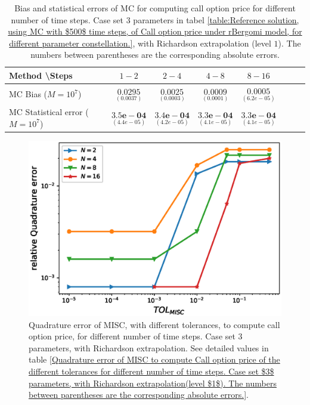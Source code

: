 \begin{table}[h!]
	\centering
	\begin{tabular}{l*{6}{c}r}
		Method \textbackslash  Steps            & $1-2$ & $2-4$ & $4-8$ & $8-16$  \\
		\hline
		MC Bias ($M=10^7$)  &$\underset{(  0.0037
			)}{\mathbf{0.0295}}$  & $\underset{( 0.0003)}{\mathbf{0.0025}}$  & $\underset{(   0.0001)}{\mathbf{0.0009}}$  & $\underset{(  6.2e-05)}{\mathbf{0.0005}}$ \\	
		
		MC Statistical error ($M=10^7$)   & $\underset{(  4.4e-05)}{\mathbf{3.5e-04}}$  & $\underset{(   4.2e-05)}{\mathbf{3.4e-04}}$  & $\underset{(  4.1e-05)}{\mathbf{3.3e-04}}$ & $\underset{(  4.1e-05)}{\mathbf{3.3e-04}}$ \\	
	
		\hline
	\end{tabular}
	\caption{Bias and statistical errors of MC   for computing call option price  for different number of time steps. Case set $3$ parameters in tabel \ref{table:Reference solution, using MC with $500$ time steps, of Call option price under rBergomi model, for different parameter constellation.}, with Richardson extrapolation (level $1$). The numbers between parentheses are the corresponding absolute errors.}
	\label{Bias and Statistical errors of MC ($M=10^7$)  for computing Call option price  for different number of time steps. Case set $3$ parameters, with Richardson extrapolation (level1). The numbers between parentheses are the corresponding absolute errors.}
\end{table}








\begin{figure}[h!]
	\centering
	\includegraphics[width=0.5\linewidth]{./figures/rBergomi_MISC_quadratre_error/vs_TOL/set5/relative_quad_error_wrt_MISC_TOL_set5_with_rich}
	
	
	\caption{Quadrature error of MISC, with  different tolerances,  to compute call option price, for different number of time steps. Case  set $3$ parameters, with Richardson extrapolation.  See detailed values  in table \ref{Quadrature error of MISC to compute Call option price of the different tolerances for different number of time steps. Case set $3$ parameters, with Richardson extrapolation(level $1$). The numbers between parentheses are the corresponding absolute errors.}.}
	\label{fig:Quadrature_error_set3_rich}
\end{figure}


